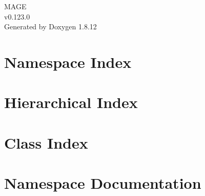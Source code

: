 \documentclass[twoside]{book}
\newcommand{\+}{\discretionary{\mbox{\scriptsize$\hookleftarrow$}}{}{}}
\newcommand{\clearemptydoublepage}{%
  \newpage{\pagestyle{empty}\cleardoublepage}%
}
\begin{document}
\hypersetup{pageanchor=false,
             bookmarksnumbered=true,
             pdfencoding=unicode
            }
\begin{titlepage}
\vspace*{7cm}
\begin{center}%
{\Large M\+A\+GE \\[1ex]\large v0.\+123.\+0 }\\
\vspace*{1cm}
{\large Generated by Doxygen 1.8.12}\\
\end{center}
\end{titlepage}
\clearemptydoublepage
{}
\tableofcontents
\clearemptydoublepage
{}
\hypersetup{pageanchor=true}

\chapter{Namespace Index}

\chapter{Hierarchical Index}

\chapter{Class Index}

\chapter{Namespace Documentation}







\end{document}
